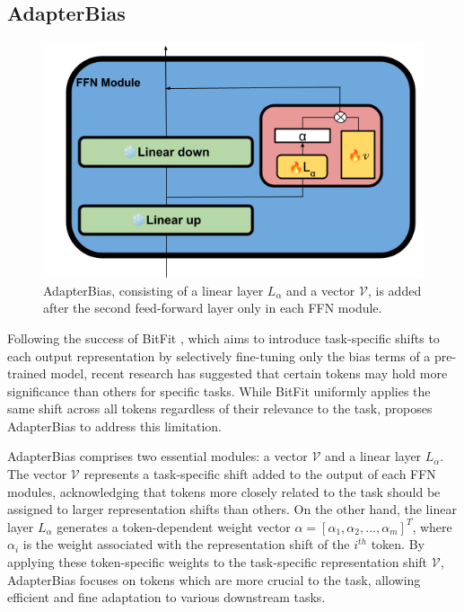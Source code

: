 \subsection{AdapterBias}
\begin{figure}
    \begin{center}
        \includegraphics[scale=0.4]{imgs/AdapterBias.png}
        \caption{ AdapterBias, consisting of a linear layer $L_\alpha$ and a vector $\mathcal{V}$, is added after the second feed-forward layer only in each FFN module.}
        \label{fig:AdapterBias}
    \end{center}
\end{figure}
Following the success of BitFit \cite{ben-zaken-etal-2022-bitfit}, which aims to introduce task-specific shifts to each output representation by selectively fine-tuning only the bias terms of a pre-trained model, recent research has suggested that certain tokens may hold more significance than others for specific tasks. While BitFit uniformly applies the same shift across all tokens regardless of their relevance to the task, \cite{fu-etal-2022-adapterbias} proposes AdapterBias to address this limitation.

AdapterBias comprises two essential modules: a vector $\mathcal{V}$ and a linear layer $L_\alpha$. The vector $\mathcal{V}$ represents a task-specific shift added to the output of each FFN modules, acknowledging that tokens more closely related to the task should be assigned to larger representation shifts than others. On the other hand, the linear layer $L_\alpha$ generates a token-dependent weight vector $\alpha = [\alpha_1, \alpha_2, ..., \alpha_m]^T$, where $\alpha_i$ is the weight associated with the representation shift of the $i^{th}$ token. By applying these token-specific weights to the task-specific representation shift $\mathcal{V}$, AdapterBias focuses on tokens which are more crucial to the task, allowing efficient and fine adaptation to various downstream tasks.

